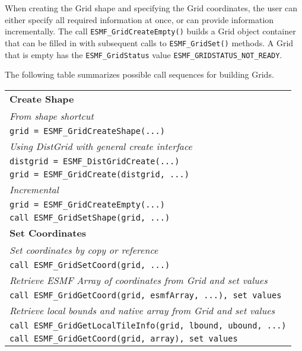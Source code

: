 When creating the Grid shape and specifying the Grid coordinates,
the user can either specify all required information at once,
or can provide information incrementally.  The call
{\tt ESMF\_GridCreateEmpty()} builds a Grid object
container that can be filled in with subsequent calls to 
{\tt ESMF\_GridSet()} methods.  A Grid that is empty
has the {\tt ESMF\_GridStatus} value
{\tt ESMF\_GRIDSTATUS\_NOT\_READY}.

The following table summarizes possible call sequences
for building Grids.

\begin{tabular}{|l|}
\hline
{\bf Create Shape} \\
{\it From shape shortcut} \\
{\tt grid = ESMF\_GridCreateShape(...)} \\
{\it Using DistGrid with general create interface} \\
{\tt distgrid = ESMF\_DistGridCreate(...)} \\
{\tt grid = ESMF\_GridCreate(distgrid, ...)} \\
{\it Incremental} \\
{\tt grid = ESMF\_GridCreateEmpty(...)} \\
{\tt call ESMF\_GridSetShape(grid, ...)} \\ \hline
{\bf Set Coordinates} \\
{\it Set coordinates by copy or reference} \\
{\tt call ESMF\_GridSetCoord(grid, ...)} \\
{\it Retrieve ESMF Array of coordinates from Grid and set values} \\
{\tt call ESMF\_GridGetCoord(grid, esmfArray, ...), set values} \\
{\it Retrieve local bounds and native array from Grid and set values} \\
{\tt call ESMF\_GridGetLocalTileInfo(grid, lbound, ubound, ...)} \\
{\tt call ESMF\_GridGetCoord(grid, array), set values} \\ \hline
\end{tabular}
